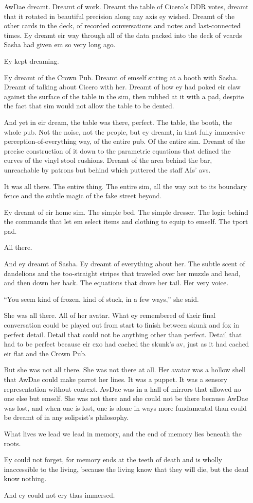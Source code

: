 AwDae dreamt. Dreamt of work. Dreamt the table of Cicero's DDR votes, dreamt that it rotated in beautiful precision along any axis ey wished. Dreamt of the other cards in the deck, of recorded conversations and notes and last-connected times. Ey dreamt eir way through all of the data packed into the deck of vcards Sasha had given em so very long ago.

Ey kept dreaming.

Ey dreamt of the Crown Pub. Dreamt of emself sitting at a booth with Sasha. Dreamt of talking about Cicero with her. Dreamt of how ey had poked eir claw against the surface of the table in the sim, then rubbed at it with a pad, despite the fact that sim would not allow the table to be dented.

And yet in eir dream, the table was there, perfect. The table, the booth, the whole pub. Not the noise, not the people, but ey dreamt, in that fully immersive perception-of-everything way, of the entire pub. Of the entire sim. Dreamt of the precise construction of it down to the parametric equations that defined the curves of the vinyl stool cushions. Dreamt of the area behind the bar, unreachable by patrons but behind which puttered the staff AIs' avs.

It was all there. The entire thing. The entire sim, all the way out to its boundary fence and the subtle magic of the fake street beyond.

Ey dreamt of eir home sim. The simple bed. The simple dresser. The logic behind the commands that let em select items and clothing to equip to emself. The tport pad.

All there.

And ey dreamt of Sasha. Ey dreamt of everything about her. The subtle scent of dandelions and the too-straight stripes that traveled over her muzzle and head, and then down her back. The equations that drove her tail. Her very voice.

``You seem kind of frozen, kind of stuck, in a few ways,'' she said.

She was all there. All of her avatar. What ey remembered of their final conversation could be played out from start to finish between skunk and fox in perfect detail. Detail that could not be anything other than perfect. Detail that had to be perfect because eir exo had cached the skunk's av, just as it had cached eir flat and the Crown Pub.

But she was not all there. She was not there at all. Her avatar was a hollow shell that AwDae could make parrot her lines. It was a puppet. It was a sensory representation without context. AwDae was in a hall of mirrors that allowed no one else but emself. She was not there and she could not be there because AwDae was lost, and when one is lost, one is alone in ways more fundamental than could be dreamt of in any solipsist's philosophy.

What lives we lead we lead in memory, and the end of memory lies beneath the roots.

Ey could not forget, for memory ends at the teeth of death and is wholly inaccessible to the living, because the living know that they will die, but the dead know nothing.

And ey could not cry thus immersed.

